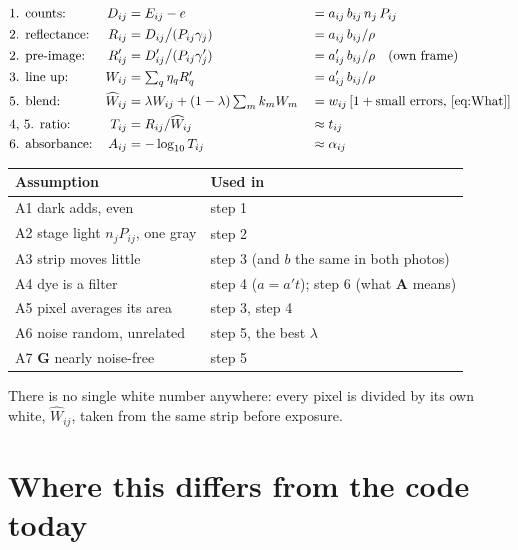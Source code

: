 \documentclass[11pt,letter]{article}
\newcommand{\iG}{\mathbf{G}}   %
\newcommand{\iA}{\mathbf{A}}   %
\newcommand{\Lten}{\log_{10}}
\begin{document}
\begin{align*}
  &\text{1. counts:}       & D_{ij} &= E_{ij} - e
     &&= a_{ij}\, b_{ij}\, n_j\, P_{ij} \\
  &\text{2. reflectance:}  & R_{ij} &= D_{ij} \big/ (P_{ij}\gamma_j)
     &&= a_{ij}\, b_{ij} / \rho \\
  &\text{2. pre-image:}    & R'_{ij} &= D'_{ij} \big/ (P_{ij}\gamma'_j)
     &&= a'_{ij}\, b_{ij} / \rho \quad\text{(own frame)} \\
  &\text{3. line up:}      & W_{ij} &= \textstyle\sum_q \eta_q R'_q
     &&= a'_{ij}\, b_{ij} / \rho \\
  &\text{5. blend:}        & \widehat W_{ij} &= \lambda W_{ij}
     + (1-\lambda)\textstyle\sum_m k_m W_m
     &&= w_{ij}\,[1 + \text{small errors, \eqref{eq:What}}] \\
  &\text{4, 5. ratio:}     & T_{ij} &= R_{ij} / \widehat W_{ij}
     &&\approx t_{ij} \\
  &\text{6. absorbance:}   & A_{ij} &= -\Lten T_{ij}
     &&\approx \alpha_{ij}
\end{align*}

\medskip
\begin{tabular}{@{}lL{8.4cm}@{}}
\toprule
Assumption & Used in \\
\midrule
A1 dark adds, even & step 1 \\
A2 stage light $n_j P_{ij}$, one gray & step 2 \\
A3 strip moves little & step 3 (and $b$ the same in both photos) \\
A4 dye is a filter & step 4 ($a = a't$); step 6 (what $\iA$ means) \\
A5 pixel averages its area & step 3, step 4 \\
A6 noise random, unrelated & step 5, the best $\lambda$ \\
A7 $\iG$ nearly noise-free & step 5 \\
\bottomrule
\end{tabular}

\medskip
\noindent There is no single white number anywhere: every pixel is divided
by its own white, $\widehat W_{ij}$, taken from the same strip before
exposure.

\section{Where this differs from the code today}
\label{sec:code}
\end{document}
